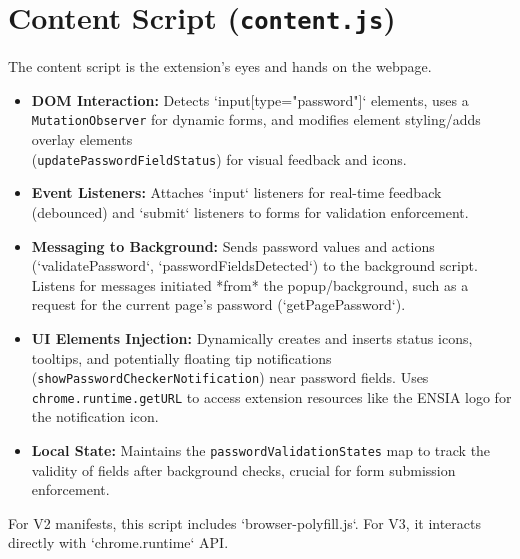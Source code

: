 \documentclass[11pt,oneside,a4paper]{book}
\begin{document}
\section{Content Script (\texttt{content.js})}
The content script is the extension's eyes and hands on the webpage.
\begin{itemize}
    \item \textbf{DOM Interaction:} Detects `input[type="password"]` elements, uses a \texttt{MutationObserver} for dynamic forms, and modifies element styling/adds overlay elements\\ (\texttt{updatePasswordFieldStatus}) for visual feedback and icons.
    \item \textbf{Event Listeners:} Attaches `input` listeners for real-time feedback (debounced) and `submit` listeners to forms for validation enforcement.
    \item \textbf{Messaging to Background:} Sends password values and actions (`validatePassword`, `passwordFieldsDetected`) to the background script. Listens for messages initiated *from* the popup/background, such as a request for the current page's password (`getPagePassword`).
    \item \textbf{UI Elements Injection:} Dynamically creates and inserts status icons, tooltips, and potentially floating tip notifications (\texttt{showPasswordCheckerNotification}) near password fields. Uses \texttt{chrome.runtime.getURL} to access extension resources like the ENSIA logo for the notification icon.
    \item \textbf{Local State:} Maintains the \texttt{passwordValidationStates} map to track the validity of fields after background checks, crucial for form submission enforcement.
\end{itemize}
For V2 manifests, this script includes `browser-polyfill.js`. For V3, it interacts directly with `chrome.runtime` API.
\end{document}

